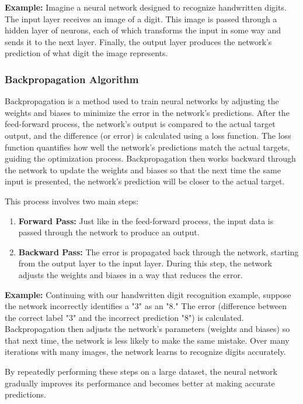 \documentclass[english,11pt,a4paper,titlepage]{article}
\begin{document}
	\textbf{Example:}
	Imagine a neural network designed to recognize handwritten digits. The input layer receives an image of a digit. This image is passed through a hidden layer of neurons, each of which transforms the input in some way and sends it to the next layer. Finally, the output layer produces the network's prediction of what digit the image represents.
	
	\subsubsection*{Backpropagation Algorithm}
	Backpropagation is a method used to train neural networks by adjusting the weights and biases to minimize the error in the network's predictions. After the feed-forward process, the network's output is compared to the actual target output, and the difference (or error) is calculated using a loss function. The loss function quantifies how well the network's predictions match the actual targets, guiding the optimization process. Backpropagation then works backward through the network to update the weights and biases so that the next time the same input is presented, the network's prediction will be closer to the actual target.
	
	This process involves two main steps:
	\begin{enumerate}
		\item \textbf{Forward Pass:} Just like in the feed-forward process, the input data is passed through the network to produce an output.
		\item \textbf{Backward Pass:} The error is propagated back through the network, starting from the output layer to the input layer. During this step, the network adjusts the weights and biases in a way that reduces the error.
	\end{enumerate}
	
	\textbf{Example:}
	Continuing with our handwritten digit recognition example, suppose the network incorrectly identifies a "3" as an "8." The error (difference between the correct label "3" and the incorrect prediction "8") is calculated. Backpropagation then adjusts the network's parameters (weights and biases) so that next time, the network is less likely to make the same mistake. Over many iterations with many images, the network learns to recognize digits accurately.
	
	By repeatedly performing these steps on a large dataset, the neural network gradually improves its performance and becomes better at making accurate predictions.
	
\end{document}
